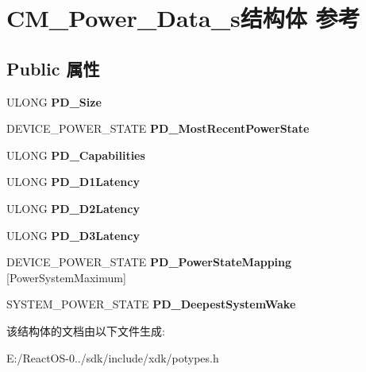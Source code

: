 \hypertarget{struct_c_m___power___data__s}{}\section{C\+M\+\_\+\+Power\+\_\+\+Data\+\_\+s结构体 参考}
\label{struct_c_m___power___data__s}
\subsection*{Public 属性}
\begin{DoxyCompactItemize}
\item 
\mbox{\label{struct_c_m___power___data__s_a877a970652a7ea978b3645d2a50ea416}} 
U\+L\+O\+NG {\bfseries P\+D\+\_\+\+Size}
\item 
\mbox{\label{struct_c_m___power___data__s_a816d707686fe5a6938cb2b322cf0bf84}} 
D\+E\+V\+I\+C\+E\+\_\+\+P\+O\+W\+E\+R\+\_\+\+S\+T\+A\+TE {\bfseries P\+D\+\_\+\+Most\+Recent\+Power\+State}
\item 
\mbox{\label{struct_c_m___power___data__s_a3571dae03d070f646a5c4d1236666e83}} 
U\+L\+O\+NG {\bfseries P\+D\+\_\+\+Capabilities}
\item 
\mbox{\label{struct_c_m___power___data__s_a669edaab9e570bea16f02753f0d9862b}} 
U\+L\+O\+NG {\bfseries P\+D\+\_\+\+D1\+Latency}
\item 
\mbox{\label{struct_c_m___power___data__s_a26783302a8324a6c158f550b70ce340a}} 
U\+L\+O\+NG {\bfseries P\+D\+\_\+\+D2\+Latency}
\item 
\mbox{\label{struct_c_m___power___data__s_abe79b9e65d79a8e9c3a6101c652dac03}} 
U\+L\+O\+NG {\bfseries P\+D\+\_\+\+D3\+Latency}
\item 
\mbox{\label{struct_c_m___power___data__s_ab484d0549241e4e7237281751af8f91f}} 
D\+E\+V\+I\+C\+E\+\_\+\+P\+O\+W\+E\+R\+\_\+\+S\+T\+A\+TE {\bfseries P\+D\+\_\+\+Power\+State\+Mapping} \mbox{[}Power\+System\+Maximum\mbox{]}
\item 
\mbox{\label{struct_c_m___power___data__s_a0a3e596f5abb067a84a1bd865efacd34}} 
S\+Y\+S\+T\+E\+M\+\_\+\+P\+O\+W\+E\+R\+\_\+\+S\+T\+A\+TE {\bfseries P\+D\+\_\+\+Deepest\+System\+Wake}
\end{DoxyCompactItemize}


该结构体的文档由以下文件生成\+:\begin{DoxyCompactItemize}
\item 
E\+:/\+React\+O\+S-\/0../sdk/include/xdk/potypes.\+h\end{DoxyCompactItemize}
